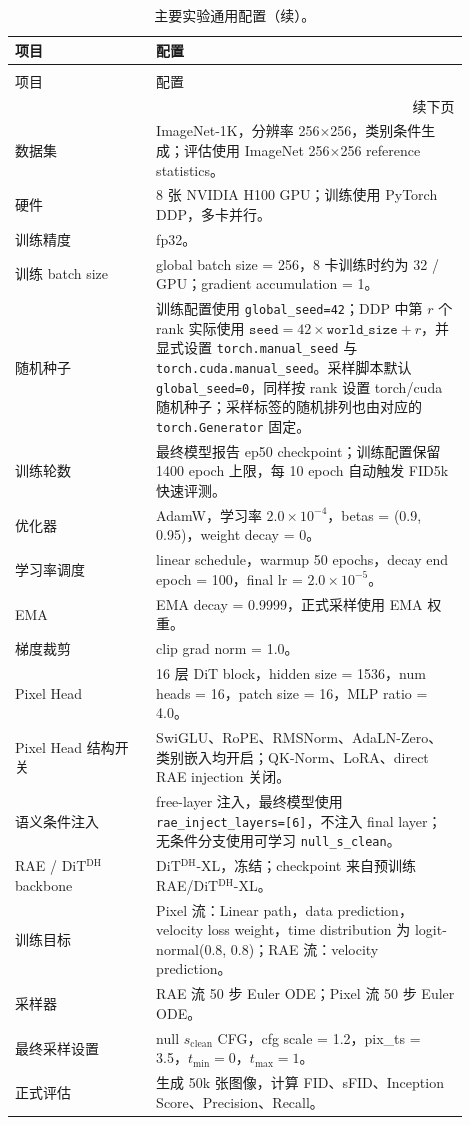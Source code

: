 \documentclass[11pt]{article}
\begin{document}
{\renewcommand{\arraystretch}{1.08}
\begin{longtable}{p{0.28\linewidth}p{0.62\linewidth}}
\caption{主要实验通用配置。除特别说明外，表中设置对应最终 16$\times$1536 模型。}\\
\toprule
项目 & 配置 \\
\midrule
\endfirsthead
\caption[]{主要实验通用配置（续）。}\\
\toprule
项目 & 配置 \\
\midrule
\endhead
\midrule
\multicolumn{2}{r}{续下页}\\
\endfoot
\bottomrule
\endlastfoot
数据集 & ImageNet-1K，分辨率 256$\times$256，类别条件生成；评估使用 ImageNet 256$\times$256 reference statistics。\\
硬件 & 8 张 NVIDIA H100 GPU；训练使用 PyTorch DDP，多卡并行。\\
训练精度 & fp32。\\
训练 batch size & global batch size = 256，8 卡训练时约为 32 / GPU；gradient accumulation = 1。\\
随机种子 & 训练配置使用 \texttt{global\_seed=42}；DDP 中第 $r$ 个 rank 实际使用 $\texttt{seed}=42\times\texttt{world\_size}+r$，并显式设置 \texttt{torch.manual\_seed} 与 \texttt{torch.cuda.manual\_seed}。采样脚本默认 \texttt{global\_seed=0}，同样按 rank 设置 torch/cuda 随机种子；采样标签的随机排列也由对应的 \texttt{torch.Generator} 固定。\\
训练轮数 & 最终模型报告 ep50 checkpoint；训练配置保留 1400 epoch 上限，每 10 epoch 自动触发 FID5k 快速评测。\\
优化器 & AdamW，学习率 $2.0\times10^{-4}$，betas = (0.9, 0.95)，weight decay = 0。\\
学习率调度 & linear schedule，warmup 50 epochs，decay end epoch = 100，final lr = $2.0\times10^{-5}$。\\
EMA & EMA decay = 0.9999，正式采样使用 EMA 权重。\\
梯度裁剪 & clip grad norm = 1.0。\\
Pixel Head & 16 层 DiT block，hidden size = 1536，num heads = 16，patch size = 16，MLP ratio = 4.0。\\
Pixel Head 结构开关 & SwiGLU、RoPE、RMSNorm、AdaLN-Zero、类别嵌入均开启；QK-Norm、LoRA、direct RAE injection 关闭。\\
语义条件注入 & free-layer 注入，最终模型使用 \texttt{rae\_inject\_layers=[6]}，不注入 final layer；无条件分支使用可学习 \texttt{null\_s\_clean}。\\
RAE / DiT$^{\mathrm{DH}}$ backbone & DiT$^{\mathrm{DH}}$-XL，冻结；checkpoint 来自预训练 RAE/DiT$^{\mathrm{DH}}$-XL。\\
训练目标 & Pixel 流：Linear path，data prediction，velocity loss weight，time distribution 为 logit-normal(0.8, 0.8)；RAE 流：velocity prediction。\\
采样器 & RAE 流 50 步 Euler ODE；Pixel 流 50 步 Euler ODE。\\
最终采样设置 & null $s_{\mathrm{clean}}$ CFG，cfg scale = 1.2，pix\_ts = 3.5，$t_{\min}=0$，$t_{\max}=1$。\\
正式评估 & 生成 50k 张图像，计算 FID、sFID、Inception Score、Precision、Recall。\\
\end{longtable}}
\end{document}
